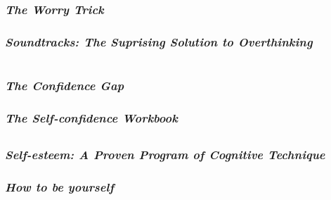 \documentclass[12pt, a4paper]{article}
\begin{document}
\section*{}
\subsubsection*{\emph{The Worry Trick}}
\subsubsection*{\emph{Soundtracks: The Suprising Solution to Overthinking}\\}

\newpage

\section*{}
\subsubsection*{\emph{The Confidence Gap}}
\subsubsection*{\emph{The Self-confidence Workbook}\\}

\subsection*{}
\subsubsection*{\emph{Self-esteem: A Proven Program of Cognitive Technique}}
\subsubsection*{\emph{How to be yourself}}
\end{document}
